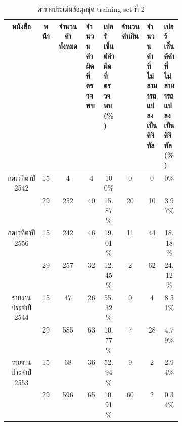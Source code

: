 \begin{table}[H]
    \caption{ตารางประเมินข้อมูลชุด training set ที่ 2}\label{tbl:smalldata}
    \begin{tabular}{|c|c|c|p{0.1\linewidth}|p{0.1\linewidth}|c|p{0.1\linewidth}|p{0.1\linewidth}|}
        \hline
        หนังสือ                             & หน้า  & จำนวนคำทั้งหมด & จำนวนคำผิดที่ตรวจพบ & เปอร์เซ็นต์คำผิดที่ตรวจพบ(\%)    & จำนวนคำเกิน & จำนวนคำที่ไม่สามารถแปลงเป็นดิจิทัล & เปอร์เซ็นต์คำที่ไม่สามารถแปลงเป็นดิจิทัล(\%)    \\ \hline
        \multirow{2}{*}{กตเวทิตาปี 2542}      & 15    & 4         & \multicolumn{1}{c|}{4  }         & \multicolumn{1}{c|}{100\%  } & \multicolumn{1}{c|}{0  }    & \multicolumn{1}{c|}{0   }            & \multicolumn{1}{c|}{0\%    } \\ \cline{2-8} 
                                            & 29    & 252       & \multicolumn{1}{c|}{40 }         & \multicolumn{1}{c|}{15.87\%} & \multicolumn{1}{c|}{20 }    & \multicolumn{1}{c|}{10  }            & \multicolumn{1}{c|}{3.97\% } \\ \hline
        \multirow{2}{*}{กตเวทิตาปี 2556}      & 15    & 242       & \multicolumn{1}{c|}{46 }         & \multicolumn{1}{c|}{19.01\%} & \multicolumn{1}{c|}{11 }    & \multicolumn{1}{c|}{44  }            & \multicolumn{1}{c|}{18.18\%} \\ \cline{2-8} 
                                            & 29    & 257       & \multicolumn{1}{c|}{32 }         & \multicolumn{1}{c|}{12.45\%} & \multicolumn{1}{c|}{2  }    & \multicolumn{1}{c|}{62  }            & \multicolumn{1}{c|}{24.12\%} \\ \hline
        \multirow{2}{*}{รายงานประจำปี 2544}   & 15    & 47        & \multicolumn{1}{c|}{26 }         & \multicolumn{1}{c|}{55.32\%} & \multicolumn{1}{c|}{0  }    & \multicolumn{1}{c|}{4   }            & \multicolumn{1}{c|}{8.51\% } \\ \cline{2-8} 
                                            & 29    & 585       & \multicolumn{1}{c|}{63 }         & \multicolumn{1}{c|}{10.77\%} & \multicolumn{1}{c|}{7  }    & \multicolumn{1}{c|}{28  }            & \multicolumn{1}{c|}{4.79\% } \\ \hline
        \multirow{2}{*}{รายงานประจำปี 2553}   & 15    & 68        & \multicolumn{1}{c|}{36 }         & \multicolumn{1}{c|}{52.94\%} & \multicolumn{1}{c|}{9  }    & \multicolumn{1}{c|}{2   }            & \multicolumn{1}{c|}{2.94\% } \\ \cline{2-8} 
                                            & 29    & 596       & \multicolumn{1}{c|}{65 }         & \multicolumn{1}{c|}{10.91\%} & \multicolumn{1}{c|}{60 }    & \multicolumn{1}{c|}{2   }            & \multicolumn{1}{c|}{0.34\% } \\ \hline

\end{tabular}
\end{table}
